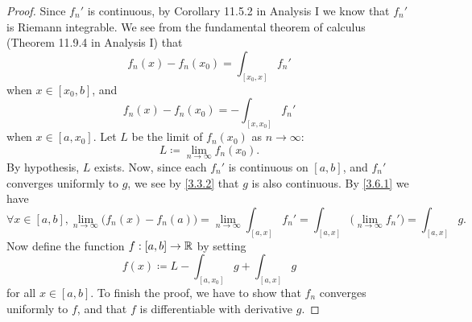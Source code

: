 \begin{proof}
  Since \(f_n'\) is continuous, by Corollary 11.5.2 in Analysis I we know that \(f_n'\) is Riemann integrable.
  We see from the fundamental theorem of calculus (Theorem 11.9.4 in Analysis I) that
  \[
    f_n(x) - f_n(x_0) = \int_{[x_0, x]} f_n'
  \]
  when \(x \in [x_0, b]\), and
  \[
    f_n(x) - f_n(x_0) = -\int_{[x, x_0]} f_n'
  \]
  when \(x \in [a, x_0]\).
  Let \(L\) be the limit of \(f_n(x_0)\) as \(n \to \infty\):
  \[
    L \coloneqq \lim_{n \to \infty} f_n(x_0).
  \]
  By hypothesis, \(L\) exists.
  Now, since each \(f_n'\) is continuous on \([a, b]\), and \(f_n'\) converges uniformly to \(g\), we see by \cref{3.3.2} that \(g\) is also continuous.
  By \cref{3.6.1} we have
  \[
    \forall x \in [a, b], \lim_{n \to \infty} \big(f_n(x) - f_n(a)\big) = \lim_{n \to \infty} \int_{[a, x]} f_n' = \int_{[a, x]} \big(\lim_{n \to \infty} f_n'\big) = \int_{[a, x]} g.
  \]
  Now define the function \(f : [a, b] \to \mathbb{R}\) by setting
  \[
    f(x) \coloneqq L - \int_{[a, x_0]} g + \int_{[a, x]} g
  \]
  for all \(x \in [a, b]\).
  To finish the proof, we have to show that \(f_n\) converges uniformly to \(f\), and that \(f\) is differentiable with derivative \(g\).


\end{proof}
